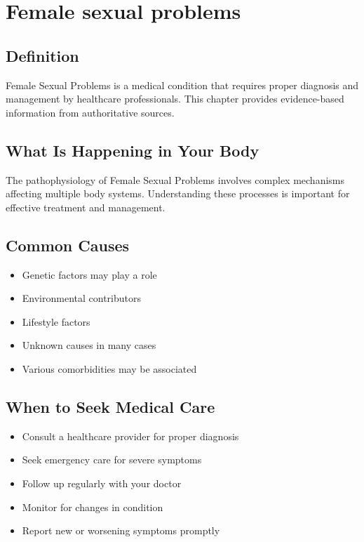 
\chapter{Female sexual problems}

\section*{Definition}
Female Sexual Problems is a medical condition that requires proper diagnosis and management by healthcare professionals. This chapter provides evidence-based information from authoritative sources.

\section*{What Is Happening in Your Body}
The pathophysiology of Female Sexual Problems involves complex mechanisms affecting multiple body systems. Understanding these processes is important for effective treatment and management.

\section*{Common Causes}
\begin{itemize}
  \item Genetic factors may play a role
  \item Environmental contributors
  \item Lifestyle factors
  \item Unknown causes in many cases
  \item Various comorbidities may be associated
\end{itemize}

\section*{When to Seek Medical Care}
\begin{itemize}
  \item Consult a healthcare provider for proper diagnosis
  \item Seek emergency care for severe symptoms
  \item Follow up regularly with your doctor
  \item Monitor for changes in condition
  \item Report new or worsening symptoms promptly
\end{itemize}

